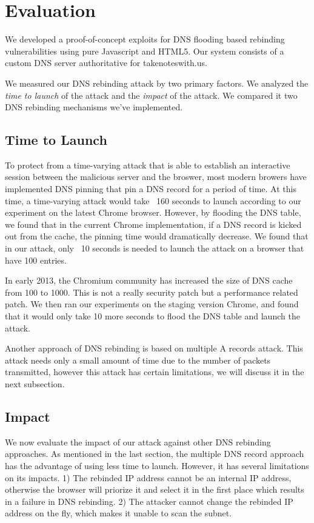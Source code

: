 \section{Evaluation}
\label{sec:eval}

We developed a proof-of-concept exploits for DNS flooding based rebinding vulnerabilities using pure Javascript and HTML5. Our system consists of a custom DNS server authoritative for takenoteswith.us.

We measured our DNS rebinding attack by two primary factors. We analyzed the \emph{time to launch} of the attack and the \emph{impact} of the attack. We compared it two DNS rebinding mechanisms we've implemented. 

\subsection{Time to Launch}
To protect from a time-varying attack that is able to establish an interactive session between the malicious server and the broswer, most modern browers have implemented DNS pinning that pin a DNS record for a period of time. At this time, a time-varying attack would take ~160 seconds to launch according to our experiment on the latest Chrome browser. However, by flooding the DNS table, we found that in the current Chrome implementation, if a DNS record is kicked out from the cache, the pinning time would dramatically decrease. We found that in our attack, only ~10 seconds is needed to launch the attack on a browser that have 100 entries. 

In early 2013, the Chromium community has increased the size of DNS cache from 100 to 1000. This is not a really security patch but a performance related patch. We then ran our experiments on the staging version Chrome, and found that it would only take 10 more seconds to flood the DNS table and launch the attack. 

Another approach of DNS rebinding is based on multiple A records attack. This attack needs only a small amount of time due to the number of packets transmitted, however this attack has certain limitations, we will discuss it in the next subsection.

\subsection{Impact}
We now evaluate the impact of our attack against other DNS rebinding approaches. As mentioned in the last section, the multiple DNS record approach has the advantage of using less time to launch. However, it has several limitations on its impacts. 1) The rebinded IP address cannot be an internal IP address, otherwise the browser will priorize it and select it in the first place which results in a failure in DNS rebinding. 2) The attacker cannot change the rebinded IP address on the fly, which makes it unable to scan the subnet. 

